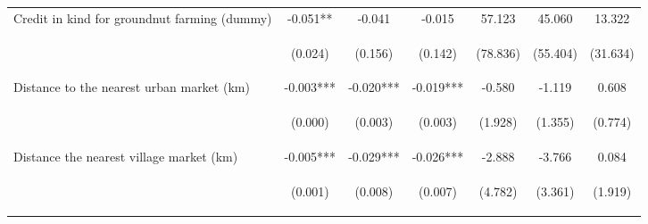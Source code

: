 \begin{center}
\begin{tabular}{lcccccc}
Credit in kind for groundnut farming (dummy) & -0.051** & -0.041 & -0.015 & 57.123 & 45.060 & 13.322 \\
\vspace{4pt} & \begin{footnotesize}(0.024)\end{footnotesize} & \begin{footnotesize}(0.156)\end{footnotesize} & \begin{footnotesize}(0.142)\end{footnotesize} & \begin{footnotesize}(78.836)\end{footnotesize} & \begin{footnotesize}(55.404)\end{footnotesize} & \begin{footnotesize}(31.634)\end{footnotesize} \\
Distance to the nearest urban market (km) & -0.003*** & -0.020*** & -0.019*** & -0.580 & -1.119 & 0.608 \\
\vspace{4pt} & \begin{footnotesize}(0.000)\end{footnotesize} & \begin{footnotesize}(0.003)\end{footnotesize} & \begin{footnotesize}(0.003)\end{footnotesize} & \begin{footnotesize}(1.928)\end{footnotesize} & \begin{footnotesize}(1.355)\end{footnotesize} & \begin{footnotesize}(0.774)\end{footnotesize} \\
Distance the nearest village market (km) & -0.005*** & -0.029*** & -0.026*** & -2.888 & -3.766 & 0.084 \\
\vspace{4pt} & \begin{footnotesize}(0.001)\end{footnotesize} & \begin{footnotesize}(0.008)\end{footnotesize} & \begin{footnotesize}(0.007)\end{footnotesize} & \begin{footnotesize}(4.782)\end{footnotesize} & \begin{footnotesize}(3.361)\end{footnotesize} & \begin{footnotesize}(1.919)\end{footnotesize} \\

\end{tabular}
\end{center}
